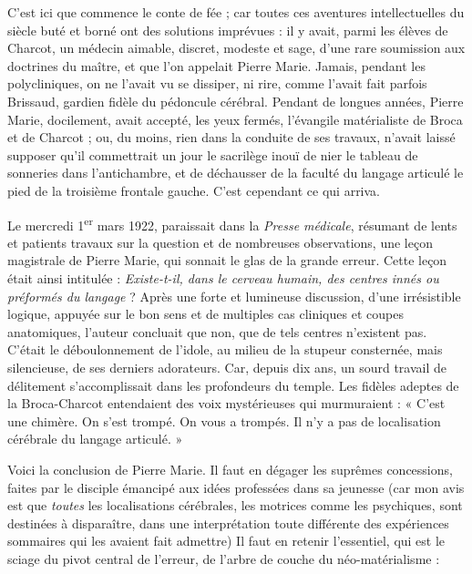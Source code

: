 \documentclass[french,twoside]{book} %
\begin{document}
C’est ici que commence le conte de fée ; car toutes ces aventures intellectuelles du siècle buté et borné ont des solutions imprévues : il y avait, parmi les élèves de Charcot, un médecin aimable, discret, modeste et sage, d’une rare soumission aux doctrines du maître, et que l’on appelait Pierre Marie. Jamais, pendant les polycliniques, on ne l’avait vu se dissiper, ni rire, comme l’avait fait parfois Brissaud, gardien fidèle du pédoncule cérébral. Pendant de longues années, Pierre Marie, docilement, avait accepté, les yeux fermés, l’évangile matérialiste de Broca et de Charcot ; ou, du moins, rien dans la conduite de ses travaux, n’avait laissé supposer qu’il commettrait un jour le sacrilège inouï de nier le tableau de sonneries dans l’antichambre, et de déchausser de la faculté du langage articulé le pied de la troisième frontale gauche. C’est cependant ce qui arriva.\par
Le mercredi 1\textsuperscript{er} mars 1922, paraissait dans la {\itshape Presse médicale}, résumant de lents et patients travaux sur la question et de nombreuses observations, une leçon magistrale de Pierre Marie, qui sonnait le glas de la grande erreur. Cette leçon était ainsi intitulée : {\itshape Existe-t-il, dans le cerveau humain, des centres innés ou préformés du langage} ? Après une forte et lumineuse discussion, d’une irrésistible logique, appuyée sur le bon sens et de multiples cas cliniques et coupes anatomiques, l’auteur concluait que non, que de tels centres n’existent pas. C’était le déboulonnement de l’idole, au milieu de la stupeur consternée, mais silencieuse, de ses derniers adorateurs. Car, depuis dix ans, un sourd travail de délitement s’accomplissait dans les profondeurs du temple. Les fidèles adeptes de la Broca-Charcot entendaient des voix mystérieuses qui murmuraient : « C’est une chimère. On s’est trompé. On vous a trompés. Il n’y a pas de localisation cérébrale du langage articulé. »\par
Voici la conclusion de Pierre Marie. Il faut en dégager les suprêmes concessions, faites par le disciple émancipé aux idées professées dans sa jeunesse (car mon avis est que {\itshape toutes} les localisations cérébrales, les motrices comme les psychiques, sont destinées à disparaître, dans une interprétation toute différente des expériences sommaires qui les avaient fait admettre) Il faut en retenir l’essentiel, qui est le sciage du pivot central de l’erreur, de l’arbre de couche du néo-matérialisme :\par
\end{document}

